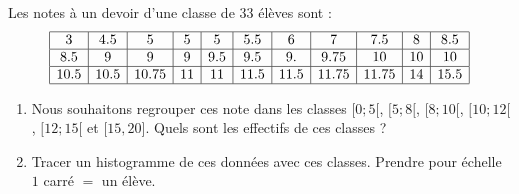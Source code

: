 
\begin{exercice}[\ldots/4]\label{exosmath-0668}

    Les notes à un devoir d'une classe de \( 33\) élèves sont :
    \begin{equation*}
        \begin{array}[]{|c|c|c|c|c|c|c|c|c|c|c|}
            \hline
            3&4.5    &5&5&5&5.5&6&7&7.5   &8&8.5\\
            \hline
            8.5&9&9&9&9.5&9.5&9.&9.75    &10&10&10\\
            \hline
            10.5&10.5&10.75&11&11&11.5&11.5&11.75&11.75&14&15.5\\
            \hline
        \end{array}
    \end{equation*}
    \begin{enumerate}
        \item
            Nous souhaitons regrouper ces note dans les classes \( \mathopen[ 0 ;5 [\), \( \mathopen[ 5 ;8 [\), \( \mathopen[ 8 ; 10 [\), \( \mathopen[ 10; 12 [\), \( \mathopen[ 12 ; 15 [\) et \( \mathopen[ 15 , 20 \mathclose]\). Quels sont les effectifs de ces classes ?
        \item
            Tracer un histogramme de ces données avec ces classes. Prendre pour échelle \( 1\) carré \( =\) un élève.
    \end{enumerate}

\end{exercice}

